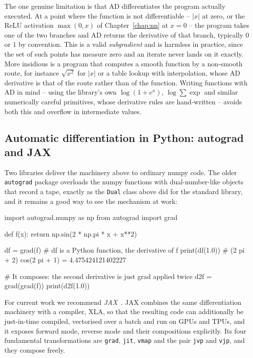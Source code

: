 The one genuine limitation is that AD differentiates the program actually
executed.  At a point where the function is not differentiable -- $|x|$ at
zero, or the ReLU activation $\max(0,x)$ of Chapter~\ref{chap:nn} at $x=0$ --
the program takes one of the two branches and AD returns the derivative of
that branch, typically $0$ or $1$ by convention.  This is a valid
\emph{subgradient} and is harmless in practice, since the set of such points
has measure zero and an iterate never lands on it exactly.  More insidious is
a program that computes a smooth function by a non-smooth route, for instance
$\sqrt{x^{2}}$ for $|x|$ or a table lookup with interpolation, whose AD
derivative is that of the route rather than of the function.  Writing
functions with AD in mind -- using the library's own $\log(1+e^{x})$,
$\log\sum\exp$ and similar numerically careful primitives, whose derivative
rules are hand-written -- avoids both this and overflow in intermediate
values.

\subsection{Automatic differentiation in Python: autograd and JAX}
\label{sec:adpython}

Two libraries deliver the machinery above to ordinary numpy code.  The older
\texttt{autograd} package overloads the numpy functions with dual-number-like
objects that record a tape, exactly as the \texttt{Dual} class above did for
the standard library, and it remains a good way to see the mechanism at work:

\begin{Python}{}
import autograd.numpy as np
from autograd import grad

def f(x):
    return np.sin(2 * np.pi * x + x**2)

df = grad(f)                 # df is a Python function, the derivative of f
print(df(1.0))               # (2 pi + 2) cos(2 pi + 1) = 4.475424121402227

# It composes: the second derivative is just grad applied twice
d2f = grad(grad(f))
print(d2f(1.0))
\end{Python}

For current work we recommend \emph{JAX}~\cite{jax2018}.  JAX combines the
same differentiation machinery with a compiler, XLA, so that the resulting
code can additionally be just-in-time compiled, vectorised over a batch and
run on GPUs and TPUs, and it exposes forward mode, reverse mode and their
compositions explicitly.  Its four fundamental transformations are
\texttt{grad}, \texttt{jit}, \texttt{vmap} and the pair \texttt{jvp} and
\texttt{vjp}, and they compose freely.

